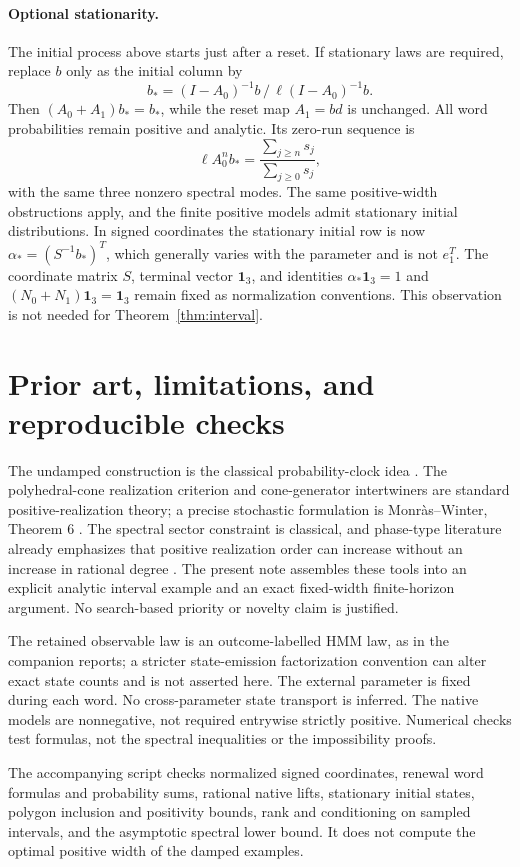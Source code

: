 \documentclass[11pt]{article}
\newcommand{\one}{\mathbf 1}
\begin{document}
\paragraph{Optional stationarity.}
The initial process above starts just after a reset. If stationary laws are required, replace $b$ only as the initial column by
\[
 b_*=(I-A_0)^{-1}b\,/\,\ell(I-A_0)^{-1}b.
\]
Then $(A_0+A_1)b_*=b_*$, while the reset map $A_1=bd$ is unchanged. All word probabilities remain positive and analytic. Its zero-run sequence is
\[
 \ell A_0^n b_* = \frac{\sum_{j\geq n}s_j}{\sum_{j\geq0}s_j},
\]
with the same three nonzero spectral modes. The same positive-width obstructions apply, and the finite positive models admit stationary initial distributions. In signed coordinates the stationary initial row is now $\alpha_*=(S^{-1}b_*)^T$, which generally varies with the parameter and is not $e_1^T$. The coordinate matrix $S$, terminal vector $\one_3$, and identities $\alpha_*\one_3=1$ and $(N_0+N_1)\one_3=\one_3$ remain fixed as normalization conventions. This observation is not needed for Theorem~\ref{thm:interval}.

\section{Prior art, limitations, and reproducible checks}
The undamped construction is the classical probability-clock idea \cite{Jaeger,Addendum}. The polyhedral-cone realization criterion and cone-generator intertwiners are standard positive-realization theory; a precise stochastic formulation is Monr\`as--Winter, Theorem 6 \cite{MW}. The spectral sector constraint is classical, and phase-type literature already emphasizes that positive realization order can increase without an increase in rational degree \cite{CM}. The present note assembles these tools into an explicit analytic interval example and an exact fixed-width finite-horizon argument. No search-based priority or novelty claim is justified.

The retained observable law is an outcome-labelled HMM law, as in the companion reports; a stricter state-emission factorization convention can alter exact state counts and is not asserted here. The external parameter is fixed during each word. No cross-parameter state transport is inferred. The native models are nonnegative, not required entrywise strictly positive. Numerical checks test formulas, not the spectral inequalities or the impossibility proofs.

The accompanying script checks normalized signed coordinates, renewal word formulas and probability sums, rational native lifts, stationary initial states, polygon inclusion and positivity bounds, rank and conditioning on sampled intervals, and the asymptotic spectral lower bound. It does not compute the optimal positive width of the damped examples.
\end{document}
